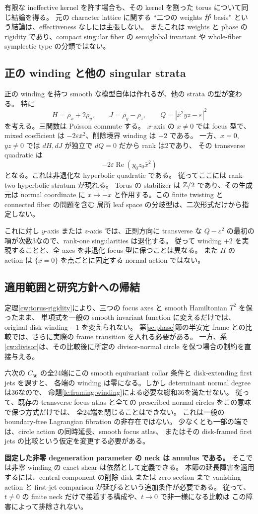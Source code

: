 有限な ineffective kernel を許す場合も、その kernel を割った torus について同じ結論を得る。
元の character lattice に関する ``二つの weights が basis'' という結論は、effectiveness なしには主張しない。
またこれは weights と phase の rigidity であり、compact singular fiber の
semiglobal invariant や whole-fiber symplectic type の分類ではない。

\subsection{正の winding と他の singular strata}

正の winding を持つ smooth な模型自体は作れるが、他の strata の型が変わる。
特に
\[
 H=\rho_x+2\rho_y,\qquad J=\rho_y-\rho_z,\qquad
 Q=|\bar x^2yz-\varepsilon|^2
\]
を考える。三関数は Poisson commute する。
$x$-axis の $x\ne0$ では focus 型で、mixed coefficient は
$-2\varepsilon\bar x^2$、削除境界 winding は $+2$ である。
一方、$x=0$, $yz\ne0$ では $dH,dJ$ が独立で $dQ=0$ だから rank は2であり、
その transverse quadratic は
\[
 -2\varepsilon\operatorname{Re}(y_0z_0\bar x^2)
\]
となる。これは非退化な hyperbolic quadratic である。
従ってここには rank-two hyperbolic stratum が現れる。
Torus の stabilizer は $\mathbb Z/2$ であり、その生成元は normal coordinate に
$x\mapsto-x$ と作用する。この finite twisting と connected fiber の問題を含む
局所 leaf space の分岐型は、二次形式だけから指定しない。

これに対し $y$-axis または $z$-axis では、正則方向に transverse な
$Q-\varepsilon^2$ の最初の項が次数3なので、rank-one singularities は退化する。
従って winding $+2$ を実現することと、全 axes を非退化 focus 型に保つことは異なる。
また $H$ の action は $\{x=0\}$ を点ごとに固定する normal action ではない。

\subsection{適用範囲と研究方針への帰結}

定理\ref{cw:torus-rigidity}により、三つの focus axes と smooth Hamiltonian $T^2$ を保ったまま、
単項式を一般の smooth invariant function に変えるだけでは、original disk winding $-1$ を変えられない。
第\ref{sc:phase}節の半安定 frame との比較では、さらに実際の frame transition を入れる必要がある。
一方、系\ref{cw:divisor}は、その比較後に所定の divisor-normal circle を保つ場合の制約を直接与える。

六次の $C_{56}$ の全24端にこの smooth equivariant collar 条件と disk-extending first jets を課すと、
各端の winding は零になる。しかし determinant normal degree は36なので、
命題\ref{lc:framing:winding}による必要な総和36を満たせない。
従って、既存の transverse focus atlas と全ての prescribed normal circles をこの意味で保つ方式だけでは、
全24端を閉じることはできない。
これは一般の boundary-free Lagrangian fibration の非存在ではない。
少なくとも一部の端では、circle action の同時延長、smooth focus atlas、
またはその disk-framed first jets の比較という仮定を変更する必要がある。

\textbf{固定した非零 degeneration parameter の neck は annulus である。}
そこでは非零 winding の exact shear は依然として定義できる。
本節の延長障害を適用するには、central component の削除 disk または zero section まで
vanishing action と first-jet comparison が延びるという追加条件が必要である。
従って、$t\ne0$ の finite neck だけで接着する構成や、$t\to0$ で非一様になる比較は
この障害によって排除されない。
